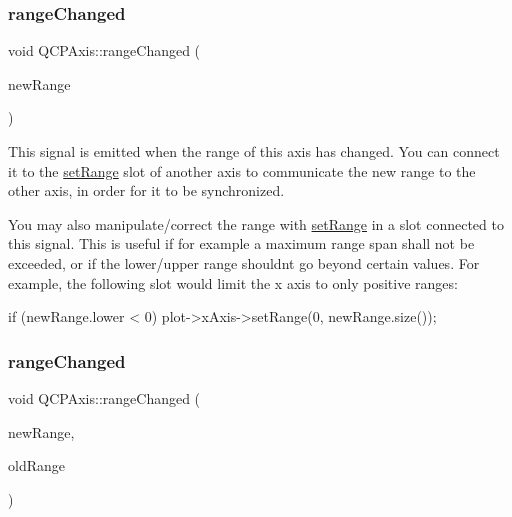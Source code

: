 \subsubsection{\texorpdfstring{range\+Changed}{rangeChanged}\hspace{0.1cm}{\footnotesize\ttfamily [1/2]}}
{\footnotesize\ttfamily void Q\+C\+P\+Axis\+::range\+Changed (\begin{DoxyParamCaption}\item[{const \mbox{\hyperlink{class_q_c_p_range}{Q\+C\+P\+Range}} \&}]{new\+Range }\end{DoxyParamCaption})\hspace{0.3cm}{\ttfamily [signal]}}

This signal is emitted when the range of this axis has changed. You can connect it to the \mbox{\hyperlink{class_q_c_p_axis_aebdfea5d44c3a0ad2b4700cd4d25b641}{set\+Range}} slot of another axis to communicate the new range to the other axis, in order for it to be synchronized.

You may also manipulate/correct the range with \mbox{\hyperlink{class_q_c_p_axis_aebdfea5d44c3a0ad2b4700cd4d25b641}{set\+Range}} in a slot connected to this signal. This is useful if for example a maximum range span shall not be exceeded, or if the lower/upper range shouldn\textquotesingle{}t go beyond certain values. For example, the following slot would limit the x axis to only positive ranges\+: 
\begin{DoxyCode}
\textcolor{keywordflow}{if} (newRange.lower < 0)
  plot->xAxis->setRange(0, newRange.size());
\end{DoxyCode}
 \mbox{\label{class_q_c_p_axis_aac8576288e8e31f16186124bc10dd10d}} 
\subsubsection{\texorpdfstring{range\+Changed}{rangeChanged}\hspace{0.1cm}{\footnotesize\ttfamily [2/2]}}
{\footnotesize\ttfamily void Q\+C\+P\+Axis\+::range\+Changed (\begin{DoxyParamCaption}\item[{const \mbox{\hyperlink{class_q_c_p_range}{Q\+C\+P\+Range}} \&}]{new\+Range,  }\item[{const \mbox{\hyperlink{class_q_c_p_range}{Q\+C\+P\+Range}} \&}]{old\+Range }\end{DoxyParamCaption})\hspace{0.3cm}{\ttfamily [signal]}}

